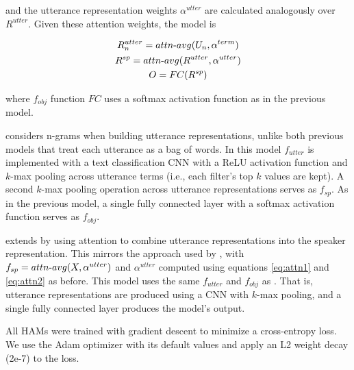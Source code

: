 and the utterance representation weights $\alpha^{utter}$ are calculated analogously over $R^{utter}$.
Given these attention weights, the  model is
\begin{spreadlines}{10pt} 
\begin{gather}
R^{utter}_n = attn{\text -}avg(U_n, \alpha^{term}) \\
R^{sp} = attn{\text -}avg(R^{utter}, \alpha^{utter}) \\
O = FC(R^{sp})
\end{gather}
\end{spreadlines}
where $f_{obj}$ function $FC$ uses a softmax activation function as in the previous model.

 considers n-grams when building utterance representations, unlike both previous models that treat each utterance as a bag of words. In this model $f_{utter}$ is implemented with a text classification CNN \cite{cnn} with a ReLU activation function and $k$-max pooling across utterance terms (i.e., each filter's top $k$ values are kept).
A second $k$-max pooling operation across utterance representations serves as $f_{sp}$.
As in the previous model, a single fully connected layer with a softmax activation function serves as $f_{obj}$.

 extends  by using attention to combine utterance representations into the speaker representation.
This mirrors the approach used by , with $f_{sp}=attn{\text -}avg(X, \alpha^{utter})$ and $\alpha^{utter}$ computed using equations \ref{eq:attn1} and \ref{eq:attn2} as before.
This model uses the same $f_{utter}$ and $f_{obj}$ as . That is, utterance representations are produced using a CNN with $k$-max pooling, and a single fully connected layer produces the model's output.

\vspace{0.5cm}
All 
HAMs
were trained with gradient descent to minimize a cross-entropy loss. 
We use the Adam optimizer \cite{adam} with its default values and apply an L2 weight decay (2e-7) to the loss.